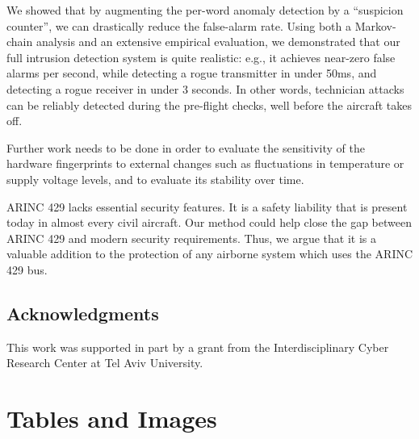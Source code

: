 \documentclass[english]{llncs}
\begin{document}
  We showed that by augmenting the per-word anomaly detection by a ``suspicion counter'', we can drastically reduce the false-alarm rate. Using both a Markov-chain analysis and an extensive empirical evaluation, we demonstrated that our full intrusion detection system is quite realistic: e.g., it achieves near-zero false alarms per second, while detecting a rogue transmitter in under 50ms, and detecting a rogue receiver in under 3 seconds. In other words, technician attacks can be reliably detected during the pre-flight checks, well before the aircraft takes off.
  
  Further work needs to be done in order to evaluate the sensitivity of the hardware fingerprints to external changes such as fluctuations in temperature or supply voltage levels, and to evaluate its stability over time.
  
  ARINC 429 lacks essential security features. It is a safety liability that is present today in almost every civil aircraft.
  Our method could help close the gap between ARINC 429 and modern security requirements. Thus, we argue that it is a valuable addition to the protection of any airborne system which uses the ARINC 429 bus.
 
\subsection*{Acknowledgments}
This work was supported in part by a grant from the Interdisciplinary Cyber Research Center at Tel Aviv University.


 

\appendix
\renewcommand\thefigure{\Roman{figure}}
\setcounter{figure}{0}

\newpage
\section{Tables and Images} \label{appendix:Tables}
\end{document}
